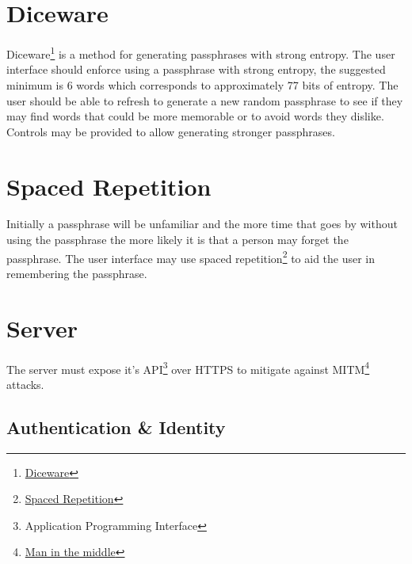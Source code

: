 \documentclass[a4paper,titlepage,oneside]{article}
\renewcommand{\paragraph}{\small}
\begin{document}
\section{Diceware}

\paragraph{Diceware\footnote{\href{https://en.wikipedia.org/wiki/Diceware}{Diceware}} is a method for generating passphrases with strong entropy. The user interface should enforce using a passphrase with strong entropy, the suggested minimum is 6 words which corresponds to approximately 77 bits of entropy. The user should be able to refresh to generate a new random passphrase to see if they may find words that could be more memorable or to avoid words they dislike. Controls may be provided to allow generating stronger passphrases.}

\section{Spaced Repetition}

\paragraph{Initially a passphrase will be unfamiliar and the more time that goes by without using the passphrase the more likely it is that a person may forget the passphrase. The user interface may use spaced repetition\footnote{\href{https://en.wikipedia.org/wiki/Spaced_repetition}{Spaced Repetition}} to aid the user in remembering the passphrase.}

\section{Server}

\paragraph{The server must expose it's API\footnote{Application Programming Interface} over HTTPS to mitigate against MITM\footnote{\href{https://en.wikipedia.org/wiki/Man-in-the-middle_attack}{Man in the middle}} attacks.}

\subsection{Authentication \& Identity}
\end{document}
